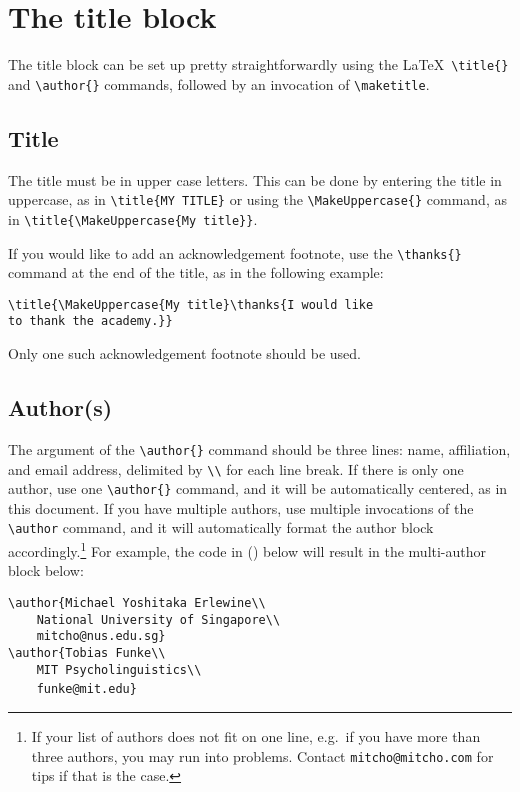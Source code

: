 \documentclass{afla}
\begin{document}
\section{The title block}

The title block can be set up pretty straightforwardly using the \LaTeX\ \verb`\title{}` and \verb`\author{}` commands, followed by an invocation of \verb`\maketitle`.

\subsection{Title}

The title must be in upper case letters. This can be done by entering the title in uppercase, as in \verb`\title{MY TITLE}` or using the \verb`\MakeUppercase{}` command, as in \verb`\title{\MakeUppercase{My title}}`.

If you would like to add an acknowledgement footnote, use the \verb`\thanks{}` command at the end of the title, as in the following example:

\ex \tt \verb`\title{\MakeUppercase{My title}\thanks{`I would like\\
	to thank the academy.\verb`}}`
\xe
\

\noindent Only one such acknowledgement footnote should be used.

\subsection{Author(s)}

The argument of the \verb`\author{}` command should be three lines: name, affiliation, and email address, delimited by \verb`\\` for each line break. If there is only one author, use one \verb`\author{}` command, and it will be automatically centered, as in this document. If you have multiple authors, use multiple invocations of the \verb`\author` command, and it will automatically format the author block accordingly.\footnote{If your list of authors does not fit on one line, e.g.~if you have more than three authors, you may run into problems. Contact \texttt{mitcho@mitcho.com} for tips if that is the case.} For example, the code in (\nextx) below will result in the multi-author block below:

\ex \verb`\author{Michael Yoshitaka Erlewine\\`\\
	\verb`    National University of Singapore\\`\\
	\verb`    mitcho@nus.edu.sg}`\\
	\verb`\author{Tobias Funke\\`\\
	\verb`    MIT Psycholinguistics\\`\\
	\verb`    funke@mit.edu}`
\xe
\
\end{document}
